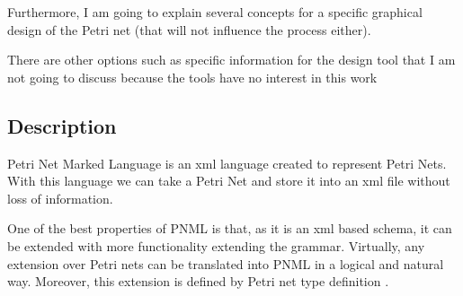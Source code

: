 Furthermore, I am going to explain several concepts for a specific graphical
design of the Petri net (that will not influence the process either).

There are other options such as specific information for the design tool
that I am not going to discuss because the tools have no interest in this work 

\subsection{Description}
Petri Net Marked Language is an xml language created to represent Petri Nets. With this language we can take a Petri Net and store it into an xml file without loss of information.

One of the best properties of PNML is that, as it is an xml based schema,
it can be extended with more functionality extending the grammar.
Virtually, any extension over Petri nets can be translated into PNML in a logical and natural way.
Moreover, this extension is defined by Petri net type definition \cite{PNML-Billington2003483,PNML-iso/iec-15909-2:2011}.
 


